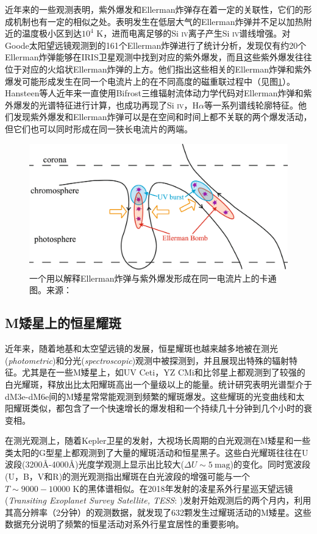 近年来的一些观测表明，紫外爆发和Ellerman炸弹存在着一定的关联性\parencite{Vissers2015,Tian2016}，它们的形成机制也有一定的相似之处。\textcite{Fang2017}表明发生在低层大气的Ellerman炸弹并不足以加热附近的温度极小区到达$10^4$ K，进而电离足够的Si \textsc{iv}离子产生Si \textsc{iv}谱线增强。\textcite{Chen2019a}对Goode太阳望远镜观测到的161个Ellerman炸弹进行了统计分析，发现仅有约20个Ellerman炸弹能够在IRIS卫星观测中找到对应的紫外爆发，而且这些紫外爆发往往位于对应的火焰状Ellerman炸弹的上方。他们指出这些相关的Ellerman炸弹和紫外爆发可能形成发生在同一个电流片上的在不同高度的磁重联过程中（见图\ref{fig:7}）。Hansteen等人近年来一直使用Bifrost三维辐射流体动力学代码对Ellerman炸弹和紫外爆发的光谱特征进行计算，也成功再现了Si \textsc{iv}，H$\alpha$等一系列谱线轮廓特征。他们发现紫外爆发和Ellerman炸弹可以是在空间和时间上都不关联的两个爆发活动\parencite{Hansteen2017}，但它们也可以同时形成在同一狭长电流片的两端\parencite{Hansteen2019}。
\begin{figure}
	\centering
	\includegraphics[width=0.7\linewidth]{figs/fig7}
	\caption{一个用以解释Ellerman炸弹与紫外爆发形成在同一电流片上的卡通图。来源：\textcites{Chen2019a}}
	\label{fig:7}
\end{figure}
\subsection{M矮星上的恒星耀斑}
近年来，随着地基和太空望远镜的发展，恒星耀斑也越来越多地被在测光(\textit{photometric})和分光(\textit{spectroscopic})观测中被探测到，并且展现出特殊的辐射特征。尤其是在一些M矮星上，如UV Ceti，YZ CMi和比邻星上都观测到了较强的白光耀斑，释放出比太阳耀斑高出一个量级以上的能量\parencite{Haisch1989}。统计研究表明光谱型介于dM3e-dM6e间的M矮星常常能观测到频繁的耀斑爆发\parencite{Lacy1976}。这些耀斑的光变曲线和太阳耀斑类似，都包含了一个快速增长的爆发相和一个持续几十分钟到几个小时的衰变相\parencite{Moffett1974,Moffett1976}。

在测光观测上，随着Kepler卫星\parencite{Borucki2010}的发射，大视场长周期的白光观测在M矮星和一些类太阳的G型星上都观测到了大量的耀斑活动和恒星黑子\parencite{Shibayama2013,Hawley2014,Davenport2014,Lurie2015,Yang2017}。这些白光耀斑往往在U波段(3200\mbox{\AA}-4000\mbox{\AA})光度学观测上显示出比较大($\Delta U\sim5\ \mathrm{mag}$)的变化\parencite{Haisch1989}。同时宽波段(U，B，V和R)的测光观测指出耀斑在白光波段的增强可能与一个$T\sim 9000-10000$ K的黑体谱相似\parencite{Hawley1991,Hawley1992}。在2018年发射的凌星系外行星巡天望远镜(\textit{Transiting Exoplanet Survey Satellite, TESS}: \cites{Ricker2014})发射开始观测后的两个月内，利用其高分辨率（2分钟）的观测数据，就发现了632颗发生过耀斑活动的M矮星\parencite{Gunther2019}。这些数据充分说明了频繁的恒星活动对系外行星宜居性的重要影响。

